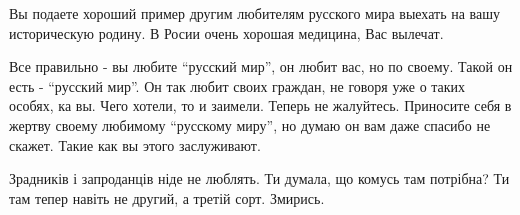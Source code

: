 \begin{itemize}

Вы подаете хороший пример другим любителям русского мира выехать на вашу
историческую родину. В Росии очень хорошая медицина, Вас вылечат.


Все правильно - вы любите \enquote{русский мир}, он любит вас, но по своему. Такой он
есть - \enquote{русский мир}. Он так любит своих граждан, не говоря уже о таких особях,
ка вы. Чего хотели, то и заимели. Теперь не жалуйтесь. Приносите себя в жертву
своему любимому \enquote{русскому миру}, но думаю он вам даже спасибо не скажет. Такие
как вы этого заслуживают.



Зрадників і запроданців ніде не люблять. Ти думала, що комусь там потрібна? Ти
там тепер навіть не другий, а третій сорт. Змирись.

\end{itemize} %
